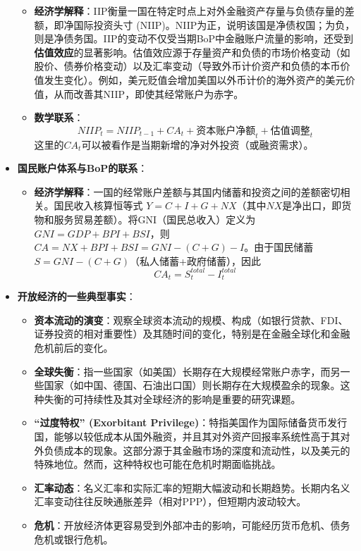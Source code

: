 \documentclass[12pt]{article}
\begin{document}
\begin{itemize}
\begin{itemize}
        \item \textbf{经济学解释}：IIP衡量一国在特定时点上对外金融资产存量与负债存量的差额，即净国际投资头寸 (NIIP)。NIIP为正，说明该国是净债权国；为负，则是净债务国。IIP的变动不仅受当期BoP中金融账户流量的影响，还受到\textbf{估值效应}的显著影响。估值效应源于存量资产和负债的市场价格变动（如股价、债券价格变动）以及汇率变动（导致外币计价资产和负债的本币价值发生变化）。例如，美元贬值会增加美国以外币计价的海外资产的美元价值，从而改善其NIIP，即使其经常账户为赤字。
        \item \textbf{数学联系}：
        \[
        NIIP_t = NIIP_{t-1} + CA_t + \text{资本账户净额}_t + \text{估值调整}_t
        \]
        这里的$CA_t$可以被看作是当期新增的净对外投资（或融资需求）。
    \end{itemize}
    \item \textbf{国民账户体系与BoP的联系}：
    \begin{itemize}
        \item \textbf{经济学解释}：一国的经常账户差额与其国内储蓄和投资之间的差额密切相关。国民收入核算恒等式 $Y = C + I + G + NX$（其中$NX$是净出口，即货物和服务贸易差额）。将GNI（国民总收入）定义为 $GNI = GDP + BPI + BSI$，则 $CA = NX + BPI + BSI = GNI - (C+G) - I$。由于国民储蓄 $S = GNI - (C+G)$（私人储蓄+政府储蓄），因此
        \[
        CA_t = S^{total}_t - I^{total}_t
        \]
    \end{itemize}
    \item \textbf{开放经济的一些典型事实}：
    \begin{itemize}
        \item \textbf{资本流动的演变}：观察全球资本流动的规模、构成（如银行贷款、FDI、证券投资的相对重要性）及其随时间的变化，特别是在金融全球化和金融危机前后的变化。
        \item \textbf{全球失衡}：指一些国家（如美国）长期存在大规模经常账户赤字，而另一些国家（如中国、德国、石油出口国）则长期存在大规模盈余的现象。这种失衡的可持续性及其对全球经济的影响是重要的研究课题。
        \item \textbf{“过度特权” (Exorbitant Privilege)}：特指美国作为国际储备货币发行国，能够以较低成本从国外融资，并且其对外资产回报率系统性高于其对外负债成本的现象。这部分源于其金融市场的深度和流动性，以及美元的特殊地位。然而，这种特权也可能在危机时期面临挑战。
        \item \textbf{汇率动态}：名义汇率和实际汇率的短期大幅波动和长期趋势。长期内名义汇率变动往往反映通胀差异（相对PPP），但短期内波动较大。
        \item \textbf{危机}：开放经济体更容易受到外部冲击的影响，可能经历货币危机、债务危机或银行危机。
    \end{itemize}
\end{itemize}
\end{document}
